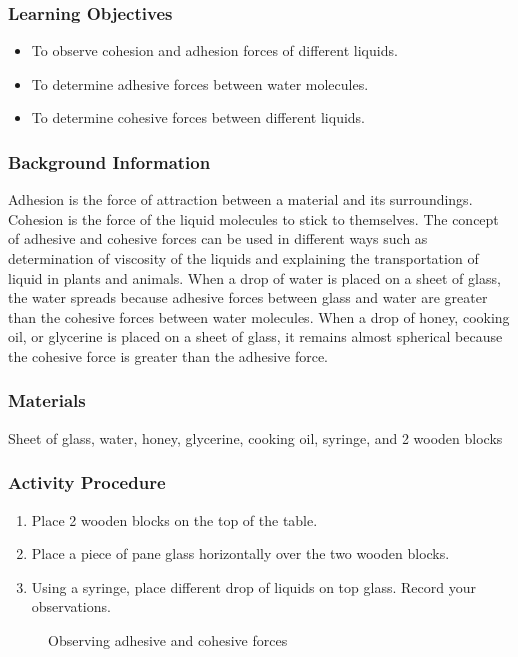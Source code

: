 \subsubsection*{Learning Objectives}
\begin{itemize}
\item{To observe cohesion and adhesion forces of different liquids.}
\item{To determine adhesive forces between water molecules.}
\item{To determine cohesive forces between different liquids.}
\end{itemize}

\subsubsection*{Background Information}
Adhesion is the force of attraction between a material and its surroundings. Cohesion is the force of the liquid molecules to stick to themselves. The concept of adhesive and cohesive forces can be used in different ways such as determination of viscosity of the liquids and explaining the transportation of liquid in plants and animals. When a drop of water is placed on a sheet of glass, the water spreads because adhesive forces between glass and water are greater than the cohesive forces between water molecules. When a drop of honey, cooking oil, or glycerine is placed on a sheet of glass, it remains almost spherical because the cohesive force is greater than the adhesive force.

\subsubsection*{Materials}
Sheet of glass, water, honey, glycerine, cooking oil, syringe, and 2 wooden blocks

\subsubsection*{Activity Procedure}
\begin{enumerate}
\item{Place 2 wooden blocks on the top of the table.}
\item{Place a piece of pane glass horizontally over the two wooden blocks.}
\item{Using a syringe, place different drop of liquids on top glass. Record your observations.}
\end{enumerate}

\begin{figure}[h]
\begin{center}
\def\svgwidth{300pt}

\caption{Observing adhesive and cohesive forces}
\label{fig:adhesion-cohesion}
\end{center}
\end{figure}

